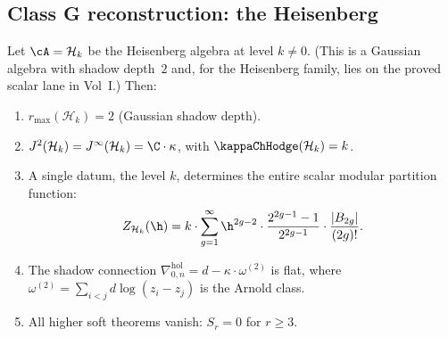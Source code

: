 \subsection{Class G reconstruction: the Heisenberg}

\begin{theorem}
Let $\cA = \mathcal{H}_k$ be the Heisenberg algebra at level $k \neq 0$.
(This is a Gaussian algebra with shadow depth~$2$ and, for the
Heisenberg family, lies on the proved scalar lane in Vol~I.)
Then:
\begin{enumerate}[label=\textup{(\roman*)}]
\item $r_{\max}(\mathcal{H}_k) = 2$ (Gaussian shadow depth).
\item $J^2(\mathcal{H}_k) = J^\infty(\mathcal{H}_k) = \C \cdot \kappa$, with
 $\kappaChHodge(\mathcal{H}_k) = k$.
\item A single datum, the level $k$, determines the entire scalar modular partition function:
 \begin{equation}
 Z_{\mathcal{H}_k}(\h)
 = k \cdot \sum_{g=1}^{\infty} \h^{2g-2} \cdot
 \frac{2^{2g-1}-1}{2^{2g-1}} \cdot \frac{|B_{2g}|}{(2g)!}.
 \end{equation}
\item The shadow connection $\nabla^{\mathrm{hol}}_{0,n} = d - \kappa \cdot \omega^{(2)}$
 is flat, where $\omega^{(2)} = \sum_{i<j} d\log(z_i - z_j)$ is the Arnold class.
\item All higher soft theorems vanish: $S_r = 0$ for $r \geq 3$.
\end{enumerate}
\end{theorem}

